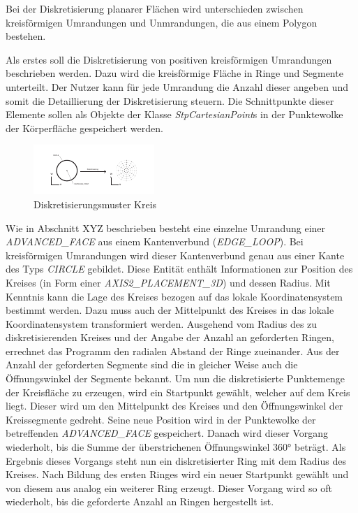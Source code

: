Bei der Diskretisierung planarer Flächen wird unterschieden zwischen kreisförmigen Umrandungen und Unmrandungen, die aus einem Polygon bestehen.

Als erstes soll die Diskretisierung von positiven kreisförmigen Umrandungen beschrieben werden. Dazu wird die kreisförmige Fläche in Ringe und Segmente unterteilt. Der Nutzer kann für jede Umrandung die Anzahl dieser angeben und somit die Detaillierung der Diskretisierung steuern. Die Schnittpunkte dieser Elemente sollen als Objekte der Klasse \textit{StpCartesianPoint}s in der Punktewolke der Körperfläche gespeichert werden. 

\begin{figure}[h]
	\centering
	
	\includegraphics[width=0.7\linewidth]{img/discretcircle.pdf}
	
	\caption{Diskretisierungsmuster Kreis}
	\label{fig:discretecircle}
	
\end{figure}

Wie in Abschnitt XYZ beschrieben besteht eine einzelne Umrandung einer \textit{ADVANCED\_FACE} aus einem Kantenverbund (\textit{EDGE\_LOOP}). Bei kreisförmigen Umrandungen wird dieser Kantenverbund genau aus einer Kante des Typs \textit{CIRCLE} gebildet. Diese Entität enthält Informationen zur Position des Kreises (in Form einer \textit{AXIS2\_PLACEMENT\_3D}) und dessen Radius.
Mit Kenntnis kann die Lage des Kreises bezogen auf das lokale Koordinatensystem bestimmt werden. Dazu muss auch der Mittelpunkt des Kreises in das lokale Koordinatensystem transformiert werden. Ausgehend vom Radius des zu diskretisierenden Kreises und der Angabe der Anzahl an geforderten Ringen, errechnet das Programm den radialen Abstand der Ringe zueinander. Aus der Anzahl der geforderten Segmente sind die in gleicher Weise auch die Öffnungswinkel der Segmente bekannt. Um nun die diskretisierte Punktemenge der Kreisfläche zu erzeugen, wird ein Startpunkt gewählt, welcher auf dem Kreis liegt. Dieser wird um den Mittelpunkt des Kreises und den Öffnungswinkel der Kreissegmente gedreht. Seine neue Position wird in der Punktewolke der betreffenden \textit{ADVANCED\_FACE} gespeichert. Danach wird dieser Vorgang wiederholt, bis die Summe der überstrichenen Öffnungswinkel 360° beträgt. Als Ergebnis dieses Vorgangs steht nun ein diskretisierter Ring mit dem Radius des Kreises. Nach Bildung des ersten Ringes wird ein neuer Startpunkt gewählt und von diesem aus analog ein weiterer Ring erzeugt. Dieser Vorgang wird so oft wiederholt, bis die geforderte Anzahl an Ringen hergestellt ist. 

